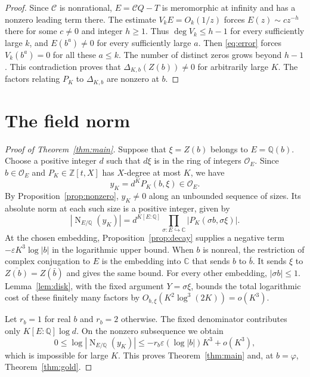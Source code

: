 \documentclass[11pt,letterpaper]{article}
\numberwithin{equation}{section}
\newcommand{\Q}{\mathbb Q}
\newcommand{\Z}{\mathbb Z}
\newcommand{\C}{\mathbb C}
\newcommand{\OK}{\mathcal O}
\DeclareMathOperator{\Nm}{N}
\begin{document}
\begin{proof}
Since \(\mathcal C\) is nonrational, \(E=\mathcal C Q-T\) is meromorphic
at infinity and has a nonzero leading term there. The estimate
\(V_kE=O_k(1/z)\) forces
\(E(z)\sim c z^{-h}\) there for some \(c\ne0\) and integer \(h\ge1\).
Thus \(\deg V_k\le h-1\) for every sufficiently large \(k\), and
\(E(b^a)\ne0\) for every sufficiently large \(a\).
Then \eqref{eq:error} forces \(V_k(b^a)=0\) for all these \(a\le k\).
The number of distinct zeros grows beyond \(h-1\). This contradiction
proves that \(\Delta_{K,b}(Z(b))\ne0\) for arbitrarily large \(K\).
The factors relating \(P_K\) to \(\Delta_{K,b}\) are nonzero at \(b\).
\end{proof}

\section{The field norm}\label{sec:norm}

\begin{proof}[Proof of Theorem~\ref{thm:main}]
Suppose that \(\xi=Z(b)\) belongs to \(E=\Q(b)\). Choose a
positive integer \(d\) such that \(d\xi\) is in the ring of
integers \(\OK_E\). Since \(b\in\OK_E\) and
\(P_K\in\Z[t,X]\) has \(X\)-degree at most \(K\), we have
\[
                       y_K=d^K P_K(b,\xi)\in\OK_E .
\]
By Proposition~\ref{prop:nonzero}, \(y_K\ne0\) along an unbounded
sequence of sizes. Its absolute norm at each such size is a positive
integer, given by
\[
  |\Nm_{E/\Q}(y_K)|
    =d^{K[E:\Q]}\prod_{\sigma:E\hookrightarrow\C}
                  |P_K(\sigma b,\sigma\xi)|.
\]
At the chosen embedding, Proposition~\ref{prop:decay} supplies a
negative term \(-\varepsilon K^3\log|b|\) in the logarithmic upper
bound. When \(b\) is nonreal, the restriction of complex conjugation
to \(E\) is the embedding into \(\C\) that sends \(b\) to \(\bar b\). It sends
\(\xi\) to \(\overline{Z(b)}=Z(\bar b)\) and gives the same bound.
For every other embedding, \(|\sigma b|\le1\). Lemma~\ref{lem:disk},
with the fixed argument \(Y=\sigma\xi\), bounds the total logarithmic
cost of these finitely many factors by \(O_{b,\xi}(K^2\log^3(2K))=o(K^3)\).

Let \(r_b=1\) for real \(b\) and \(r_b=2\) otherwise. The fixed
denominator contributes only \(K[E:\Q]\log d\). On the nonzero
subsequence we obtain
\[
   0\le \log|\Nm_{E/\Q}(y_K)|
       \le -r_b\varepsilon(\log|b|)K^3+o(K^3),
\]
which is impossible for large \(K\). This proves
Theorem~\ref{thm:main} and, at \(b=\varphi\),
Theorem~\ref{thm:gold}.
\end{proof}
\end{document}
